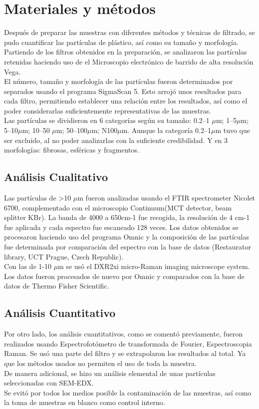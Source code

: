 \documentclass[a4paper,11pt]{article}
\begin{document}
\section{Materiales y métodos}
	Después de preparar las muestras con diferentes métodos y técnicas de filtrado, se pudo cuantificar las partículas de plástico, así como su tamaño y morfología.\\
	Partiendo de los filtros obtenidos en la preparación, se analizaron las partículas retenidas haciendo uso de el Microscopio electrónico de barrido de alta resolución Vega.\\
	El número, tamaño y morfología de las partículas fueron determinados por separados usando el programa SigmaScan 5. Esto arrojó unos resultados para cada filtro, permitiendo establecer una relación entre los resultados, así como el poder considerarlas suficientemente representativas de las muestras.\\
	Las partículas se dividieron en 6 categorías según su tamaño: 0.2–1 $\mu$m; 1–5$\mu$m; 5–10$\mu$m; 10–50 $\mu$m; 50–100$\mu$m; N100$\mu$m.
	Aunque la categoría 0.2–1$\mu$m tuvo que ser excluido, al no poder analizarlas con la suficiente credibilidad.
	Y en 3 morfologías: fibrosas, esféricas y fragmentos.

	\subsection{Análisis Cualitativo}
	Las partículas de >10 $\mu$m fueron analizadas usando el FTIR spectrometer Nicolet 6700, complementado con el microscopio Continuum(MCT detector, beam splitter KBr). La banda de 4000 a 650cm-1 fue recogida, la resolución de 4 cm-1 fue aplicada y cada espectro fue escaneado 128 veces. Los datos obtenidos se procesaron haciendo uso del programa Omnic y la composición de las partículas fue determinada por comparación del espectro con la base de datos (Restaurator library, UCT Prague, Czech Republic).\\
	Con las de 1-10 $\mu$m se usó el DXR2xi micro-Raman imaging microscope system. Los datos fueron procesados de nuevo por Omnic y comparados con la base de datos de Thermo Fisher Scientific.
	
	\subsection{Análisis Cuantitativo}
	Por otro lado, los análisis cuantitativos, como se comentó previamente, fueron realizados usando Espectrofotómetro de transformada de Fourier, Espectroscopia Raman. Se usó una parte del filtro y se extrapolaron los resultados al total. Ya que los métodos usados no permiten el uso de toda la muestra.\\
	De manera adicional, se hizo un análisis elemental de unas partículas seleccionadas con SEM-EDX.\\
	Se evitó por todos los medios posible la contaminación de las muestras, así como la toma de muestras en blanco como control interno.
\end{document}
